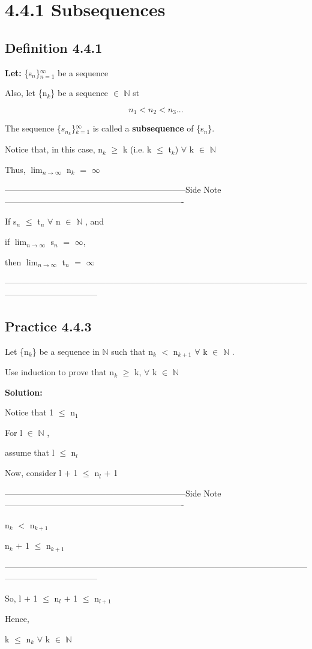 \documentclass{article}
\newcommand{\mt}[1]{\ensuremath{#1}}
\newcommand\bsc[2][\DefaultOpt]{%
  \def\DefaultOpt{#2}%
  \section[#1]{#2}%
}
\newcommand\ssc[2][\DefaultOpt]{%
  \def\DefaultOpt{#2}%
  \subsection[#1]{#2}%
}
\newcommand{\lt}[1]{\textbf{Let: } #1}
\newcommand{\dbs}[3]{\mt{#1_{#2_#3}}}
\newcommand{\sidenote}[1]{-----------------------------------------------------------------Side Note----------------------------------------------------------------
#1 \

---------------------------------------------------------------------------------------------------------------------------------------------}
\newcommand{\bn}{\mt{\mathbb{N}} }       %
\newcommand{\fa}{\mt{\forall} }          %
\newcommand{\mem}{\mt{\in} }
\newcommand{\bk}[1]{\{#1\}}
\newcommand{\ps}{\mt{+} }
\newcommand{\ls}{\mt{<} }
\newcommand{\lse}{\mt{\leq} }
\newcommand{\gre}{\mt{\geq} }
\newcommand{\eql}{\mt{=} }
\newcommand{\uw}[2]{#1\mt{_{#2}}}
\newcommand{\lmti}[1]{\mt{\displaystyle{\lim_{#1 \to \infty}}}}
\newcommand{\eqn}[1]{\[#1\]}
\begin{document}
\bsc{4.4.1 Subsequences}{

\ssc{Definition 4.4.1}{

\lt{\bk{\uw{s}{n}}$^\infty_{n = 1}$ be a sequence}

Also, let \bk{\uw{n}{k}} be a sequence \mem \bn st

\eqn{n_1 < n_2 < n_3 ...}

The sequence \bk{\dbs{s}{n}{k}}$^\infty_{k = 1}$ is called a \textbf{subsequence} of \bk{\uw{s}{n}}.

Notice that, in this case, \uw{n}{k} \gre k (i.e. k \lse \uw{t}{k}) \fa k \mem \bn

Thus, \lmti{n} \uw{n}{k} \eql $\infty$

\sidenote{
If \uw{s}{n} \lse \uw{t}{n} \fa n \mem \bn, and

if \lmti{n} \uw{s}{n} \eql $\infty$,

then \lmti{n} \uw{t}{n} \eql $\infty$
}

}

\ssc{Practice 4.4.3}{
Let \bk{\uw{n}{k}} be a sequence in \bn such that \uw{n}{k} \ls \uw{n}{k + 1} \fa k \mem \bn.

Use induction to prove that \uw{n}{k} \gre k, \fa k \mem \bn 

\textbf{Solution:}

Notice that 1 \lse \uw{n}{1}

For l \mem \bn, 

assume that l \lse \uw{n}{l}

Now, consider l \ps 1 \lse \uw{n}{l} \ps 1

\sidenote{
\uw{n}{k} \ls \uw{n}{k + 1}

\uw{n}{k} \ps 1 \lse \uw{n}{k + 1}
}

So, l \ps 1 \lse \uw{n}{l} \ps 1 \lse \uw{n}{l + 1}

Hence,

k \lse \uw{n}{k} \fa k \mem \bn 
}
}
\end{document}
